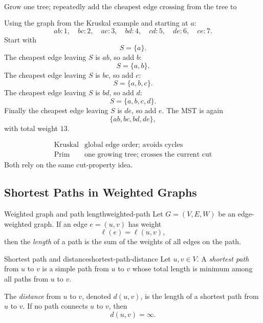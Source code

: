 \begin{keyformula}[title={Prim's rule}]
\[
\text{Grow one tree; repeatedly add the cheapest edge crossing from the tree to outside.}
\]
\end{keyformula}

\begin{examplebox}[title={Prim example on the same graph}]
Using the graph from the Kruskal example and starting at \(a\):
\[
ab:1,\quad bc:2,\quad ac:3,\quad bd:4,\quad cd:5,\quad de:6,\quad ce:7.
\]
Start with
\[
S=\{a\}.
\]
The cheapest edge leaving \(S\) is \(ab\), so add \(b\):
\[
S=\{a,b\}.
\]
The cheapest edge leaving \(S\) is \(bc\), so add \(c\):
\[
S=\{a,b,c\}.
\]
The cheapest edge leaving \(S\) is \(bd\), so add \(d\):
\[
S=\{a,b,c,d\}.
\]
Finally the cheapest edge leaving \(S\) is \(de\), so add \(e\). The MST is again
\[
\{ab,bc,bd,de\},
\]
with total weight \(13\).
\end{examplebox}

\begin{examtip}[title={Kruskal versus Prim}]
\[
\begin{array}{c|c}
\text{Kruskal} & \text{global edge order; avoids cycles} \\
\text{Prim} & \text{one growing tree; crosses the current cut}
\end{array}
\]
Both rely on the same cut-property idea.
\end{examtip}

\subsection{Shortest Paths in Weighted Graphs}

\begin{definition}{Weighted graph and path length}{weighted-path}
Let \(G=(V,E,W)\) be an edge-weighted graph. If an edge \(e=(u,v)\) has weight
\[
\ell(e)=\ell(u,v),
\]
then the \emph{length} of a path is the sum of the weights of all edges on the path.
\end{definition}

\begin{definition}{Shortest path and distance}{shortest-path-distance}
Let \(u,v\in V\). A \emph{shortest path} from \(u\) to \(v\) is a simple path from \(u\) to \(v\) whose total length is minimum among all paths from \(u\) to \(v\).

The \emph{distance} from \(u\) to \(v\), denoted \(d(u,v)\), is the length of a shortest path from \(u\) to \(v\). If no path connects \(u\) to \(v\), then
\[
d(u,v)=\infty.
\]
\end{definition}

